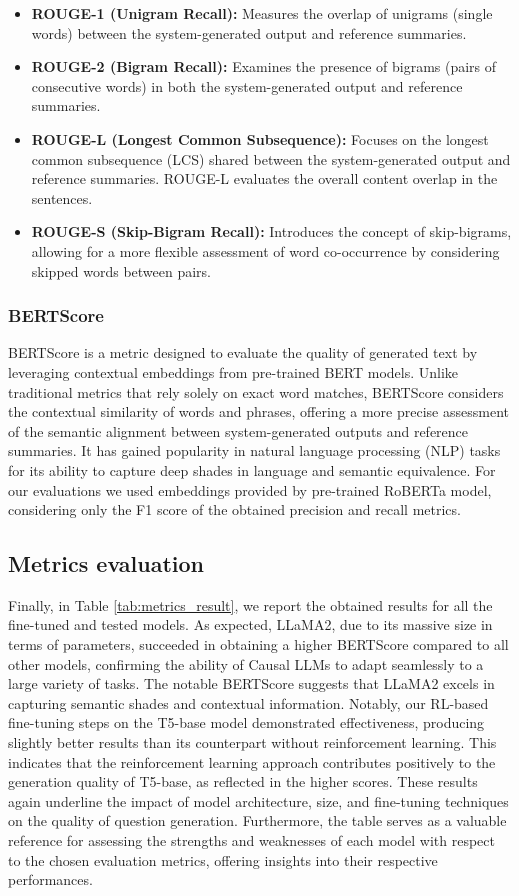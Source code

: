 \documentclass{article}
\begin{document}
\begin{itemize}
    \item \textbf{ROUGE-1 (Unigram Recall):}
        Measures the overlap of unigrams (single words) between the system-generated output and reference summaries.
    \item \textbf{ROUGE-2 (Bigram Recall):}
        Examines the presence of bigrams (pairs of consecutive words) in both the system-generated output and reference summaries.
    \item \textbf{ROUGE-L (Longest Common Subsequence):}
        Focuses on the longest common subsequence (LCS) shared between the system-generated output and reference summaries. ROUGE-L evaluates the overall content overlap in the sentences.
    \item \textbf{ROUGE-S (Skip-Bigram Recall):}
    Introduces the concept of skip-bigrams, allowing for a more flexible assessment of word co-occurrence by considering skipped words between pairs.
\end{itemize}

\subsubsection{BERTScore}
BERTScore is a metric designed to evaluate the quality of generated text by leveraging contextual embeddings from pre-trained BERT models. Unlike traditional metrics that rely solely on exact word matches, BERTScore considers the contextual similarity of words and phrases, offering a more precise assessment of the semantic alignment between system-generated outputs and reference summaries. It has gained popularity in natural language processing (NLP) tasks for its ability to capture deep shades in language and semantic equivalence. For our evaluations we used embeddings provided by pre-trained RoBERTa \cite{roberta} model, considering only the F1 score of the obtained precision and recall metrics.

\subsection{Metrics evaluation}
Finally, in Table \ref{tab:metrics_result}, we report the obtained results for all the fine-tuned and tested models. As expected, LLaMA2, due to its massive size in terms of parameters, succeeded in obtaining a higher BERTScore compared to all other models, confirming the ability of Causal LLMs to adapt seamlessly to a large variety of tasks. The notable BERTScore suggests that LLaMA2 excels in capturing semantic shades and contextual information. Notably, our RL-based fine-tuning steps on the T5-base model demonstrated effectiveness, producing slightly better results than its counterpart without reinforcement learning. This indicates that the reinforcement learning approach contributes positively to the generation quality of T5-base, as reflected in the higher scores.
These results again underline the impact of model architecture, size, and fine-tuning techniques on the quality of question generation. Furthermore, the table serves as a valuable reference for assessing the strengths and weaknesses of each model with respect to the chosen evaluation metrics, offering insights into their respective performances.
\end{document}
